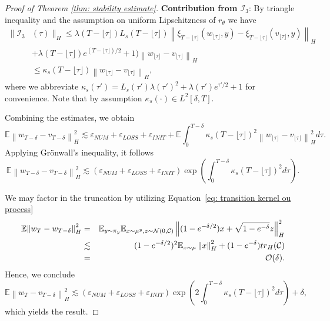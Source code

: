 \documentclass[10pt]{article} %
\def\Eqref#1{Equation~\ref{#1}}
\newcommand{\E}{\mathbb{E}}
\theoremstyle{plain}
\theoremstyle{definition}
\theoremstyle{remark}
\newcommand{\tr}{{\rm tr}}
\newcommand{\norm}[1]{\left\|#1\right\|}
\newcommand{\C}{\mathcal C}
\newcommand{\N}{\mathcal N}
\newcommand{\low}[1]{{\lfloor #1 \rfloor}}
\begin{document}
\begin{proof}[Proof of Theorem \ref{thm: stability estimate}]
{\bf Contribution from ${\mathcal I_3}$}: By triangle inequality and the assumption on uniform Lipschitzness of $r_\theta$ we have
\begin{align*}
	\big\|{\mathcal I}_3 & (\tau)\big\|_H \leq  
	\lambda(T-\low\tau) L_s(T-\low\tau)
	\norm{\xi_{T-\low\tau}(w_{\low\tau}, y) -\xi_{T-\low\tau}(v_{\low\tau}, y)}_H \\
	&   %
	+\lambda(T-\low\tau)e^{(T-\low\tau)/2} +1) \norm{w_{\low\tau}-v_{\low\tau}}_H \\
	& \le \kappa_s(T-\low\tau) \norm{w_{\low\tau}-v_{\low\tau}}_H,
\end{align*}
where we abbreviate $\kappa_s(\tau') = L_s(\tau')\lambda(\tau')^2 +\lambda(\tau')e^{\tau'/2} +1$ for convenience. Note that by assumption $\kappa_s(\cdot) \in L^2[\delta, T]$.


Combining the estimates, we obtain
\begin{equation*}
	\E \norm{w_{T-\delta} -  v_{T-\delta}}_H^2 \lesssim
	\varepsilon_{NUM} + \varepsilon_{LOSS} + \varepsilon_{INIT} + \E \int_0^{T-\delta} \kappa_s(T-\low\tau)^2 \norm{w_{\low\tau}-v_{\low\tau}}_H^2 d\tau.
\end{equation*}
Applying Gr\"onwall's inequality, it follows
\begin{equation*}
	\E \norm{w_{T-\delta} -  v_{T-\delta}}_H^2 \lesssim
	\left(\varepsilon_{NUM} + \varepsilon_{LOSS} + \varepsilon_{INIT}\right) \exp\left(\int_0^{T-\delta} \kappa_s(T-\low\tau)^2 d\tau\right).
\end{equation*}


We may factor in the truncation by utilizing \Eqref{eq: transition kernel ou process}
\begin{eqnarray*}
    \E {\norm{w_T -  w_{T-\delta}}_H^2} &=& \E_{y\sim \pi_y}\E_{x\sim\mu^y, z\sim \N(0,\C)}\norm{(1- e^{-\delta/2})x + \sqrt{1-e^{-\delta}} z}_H^2 \\
    & \lesssim &  (1- e^{-\delta/2})^2 \E_{x\sim\mu}\norm{x}_H^2 + (1-e^{-\delta})  \tr_H(\C) \\
    & = & {\mathcal O}(\delta).
\end{eqnarray*}
Hence, we conclude
\begin{equation*}
    \E \norm{w_T -  v_{T-\delta}}_H^2
    \lesssim \left(\varepsilon_{NUM} + \varepsilon_{LOSS} + \varepsilon_{INIT}\right) \exp\left( 2 \int_0^{T-\delta} \kappa_s(T-\low\tau)^2 d\tau\right) +  \delta,
\end{equation*}
which yields the result.
\end{proof}
\end{document}
